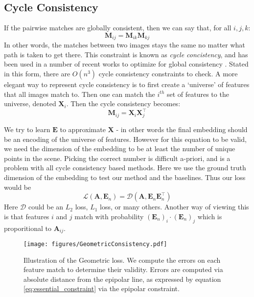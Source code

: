 \documentclass[10pt,twocolumn,letterpaper]{article}
\newcommand{\mat}[1]{\mathbf{#1}}
\begin{document}
\subsection{Cycle Consistency}
If the pairwise matches are globally consistent, then we can say that, for all $i, j, k$:
\begin{equation}
\mat{M}_{ij} = \mat{M}_{ik} \mat{M}_{kj}
\label{eq:cycconsist1}
\end{equation}
In other words, the matches between two images stays the same no matter what path is taken to get there. 
This constraint is known as \textit{cycle concistency}, and has been used in a number of recent works to optimize for global consistency \cite{zhou2015multi, wang2017multi, leonardos2016distributed}.
Stated in this form, there are $O(n^3)$ cycle consistency constraints to check.
A more elegant way to represent cycle consistency is to first create a `universe' of features that all images match to.
Then one can match the $i^{th}$ set of features to the universe, denoted $\mat{X}_i$.
Then the cycle consistency becomes:
\begin{equation}
\mat{M}_{ij} = \mat{X}_{i}\mat{X}_{j}^\top
\label{eq:cycconsist2}
\end{equation}

We try to learn $\mat{E}$ to approximate $\mat{X}$ - in other words the final embedding should be an encoding of the universe of features.
However for this equation to be valid, we need the dimension of the embedding to be at least the number of unique points in the scene.
Picking the correct number is difficult a-priori, and is a problem with all cycle consistency based methods.
Here we use the ground truth dimension of the embedding to test our method and the baselines.
Thus our loss would be 
\begin{equation}
\mathcal{L}(\mat{A}, \mat{E}_n) = \mathcal{D}(\mat{A}, \mat{E}_n\mat{E}_n^\top)
\end{equation}
Here $\mathcal{D}$ could be an $L_2$ loss, $L_1$ loss, or many others. 
Another way of viewing this is that features $i$ and $j$ match with probability $(\mat{E}_n)_i \cdot (\mat{E}_n)_j$ which is proporitional to $\mat{A}_{ij}$.

\begin{figure}[t]
\begin{center}
  \texttt{[image: figures/GeometricConsistency.pdf]}
\end{center}
  \caption{
    Illustration of the Geometric loss.
    We compute the errors on each feature match to determine their validity.
    Errors are computed via absolute distance from the epipolar line, as expressed by equation \ref{eq:essential_constraint} via the epipolar constraint.
  }
\label{fig:cycconsistex}
\label{fig:onecol}
\end{figure}
\end{document}
